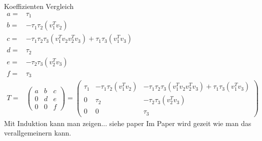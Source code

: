Koeffizienten Vergleich
\begin{align*}
	a =&  \tau_1\\
	b =& -\tau_1 \tau_2 (v_1^T v_2 ) \\
	c =& -\tau_1 \tau_2  \tau_3 (v_1^T v_2 v_2^T v_3) + \tau_1 \tau_3  (v_1^T v_3)\\
	d =&  \tau_2 \\
	e =& -\tau_2 \tau_3  (v_2^T v_3)\\
    f =&  \tau_3\\
	T =&
	\begin{pmatrix}
	a & b & c\\ 
	0 & d & e\\
	0 & 0 & f
	\end{pmatrix} =
	\begin{pmatrix}
		\tau_1 & -\tau_1 \tau_2 (v_1^T v_2 ) & - \tau_1 \tau_2  \tau_3 (v_1^T v_2 v_2^T v_3) + \tau_1 \tau_3  (v_1^T v_3)\\ 
		0 & \tau_2 &  -\tau_2 \tau_3  (v_2^T v_3)\\
		0 & 0 & \tau_3
	\end{pmatrix}
\end{align*}
Mit Induktion kann man zeigen... siehe paper
Im Paper wird gezeit wie man das verallgemeinern kann. \cite{Joffrain:2006:AHT:1141885.1141886}
%

